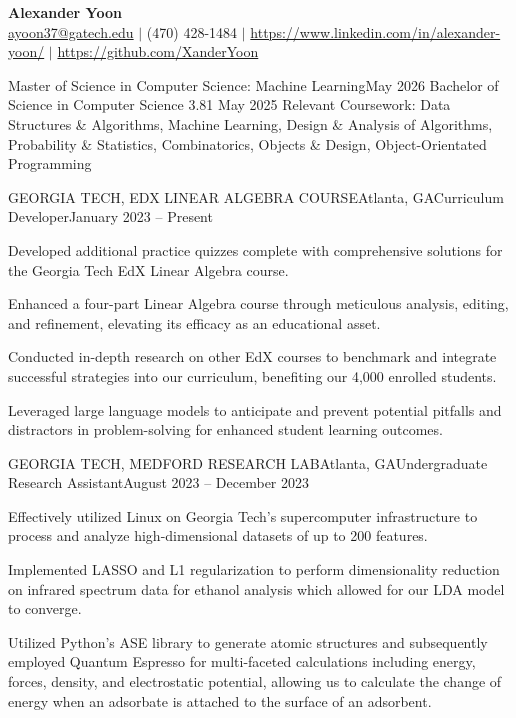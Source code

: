 \documentclass{article}
\begin{document}
\thispagestyle{empty}

\begin{center}
    \textbf{\LARGE Alexander Yoon} \\
    \href{mailto:"ayoon37@gatech.edu"}{ayoon37@gatech.edu} $|$ (470) 428-1484 $|$ \href{https://www.linkedin.com/in/alexander-yoon/}{https://www.linkedin.com/in/alexander-yoon/} $|$ \href{https://github.com/XanderYoon}{https://github.com/XanderYoon}\\
\end{center}

\begin{flushleft}


{Master of Science in Computer Science: Machine Learning}{May 2026}
{Bachelor of Science in Computer Science}{ 3.81} {May 2025}
{Relevant Coursework: Data Structures \& Algorithms, Machine Learning, Design \& Analysis of Algorithms, Probability \& Statistics, Combinatorics, Objects \& Design, Object-Orientated Programming}


    \begin{experience}{GEORGIA TECH, EDX LINEAR ALGEBRA COURSE}{Atlanta, GA}{Curriculum Developer}{January 2023 -- Present}
        \item Developed additional practice quizzes complete with comprehensive solutions for the Georgia Tech EdX Linear Algebra course.
        \item Enhanced a four-part Linear Algebra course through meticulous analysis, editing, and refinement, elevating its efficacy as an educational asset.
        \item Conducted in-depth research on other EdX courses to benchmark and integrate successful strategies into our curriculum, benefiting our 4,000 enrolled students.
        \item Leveraged large language models to anticipate and prevent potential pitfalls and distractors in problem-solving for enhanced student learning outcomes.
    \end{experience}

    \begin{experience}{GEORGIA TECH, MEDFORD RESEARCH LAB}{Atlanta, GA}{Undergraduate Research Assistant}{August 2023 -- December 2023}
        \item Effectively utilized Linux on Georgia Tech's supercomputer infrastructure to process and analyze high-dimensional datasets of up to 200 features. 
        \item Implemented LASSO and L1 regularization to perform dimensionality reduction on infrared spectrum data for ethanol analysis which allowed for our LDA model to converge. 
        \item Utilized Python's ASE library to generate atomic structures and subsequently employed Quantum Espresso for multi-faceted calculations including energy, forces, density, and electrostatic potential, allowing us to calculate the change of energy when an adsorbate is attached to the surface of an adsorbent.
    \end{experience}


\end{flushleft}
\end{document}
